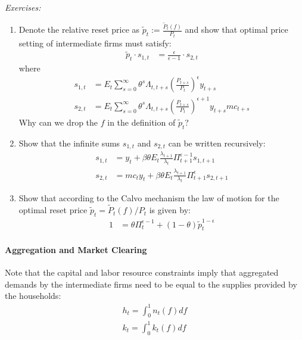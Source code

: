 \newpage
~\\\noindent\emph{Exercises:}
\begin{enumerate}[resume]

\item Denote the relative reset price as $\widetilde{p}_t := \frac{\widetilde{P}_t(f)}{P_t}$ and 
  show that optimal price setting of intermediate firms must satisfy:
\begin{align}
\widetilde{p}_t \cdot s_{1,t} &= \frac{\epsilon}{\epsilon-1} \cdot s_{2,t} \label{eq:NewKeynesian.IntermediateFirms.PriceSetting}
\end{align}
where
\begin{align*}
s_{1,t} &= E_t\sum_{s=0}^{\infty}\theta^s \Lambda_{t,t+s} \left(\frac{P_{t+s}}{P_t}\right)^{\epsilon} y_{t+s}
\\
s_{2,t} &= E_t \sum_{s=0}^{\infty}\theta^s \Lambda_{t,t+s} \left(\frac{P_{t+s}}{P_t}\right)^{\epsilon+1} y_{t+s} mc_{t+s}
\end{align*}
Why can we drop the $f$ in the definition of $\widetilde{p}_t$?

\item Show that the infinite sums $s_{1,t}$ and $s_{2,t}$ can be written recursively:
\begin{align}
s_{1,t} &= y_t             + \beta \theta E_t \frac{\lambda_{t+1}}{\lambda_t} \Pi_{t+1}^{\epsilon-1}s_{1,t+1}
\label{eq:NewKeynesian.IntermediateFirms.PriceSettingSum1}
\\
s_{2,t} &=  mc_t y_{t}  + \beta \theta E_t \frac{\lambda_{t+1}}{\lambda_t} \Pi_{t+1}^{\epsilon} s_{2,t+1}
\label{eq:NewKeynesian.IntermediateFirms.PriceSettingSum2}
\end{align}

\item Show that according to the Calvo mechanism the law of motion for the optimal reset price $\widetilde{p}_t = \widetilde{P}_t(f) / P_t$ is given by:
\begin{align}
1&=\theta \Pi_{t}^{\epsilon-1}+\left(1-\theta\right) \widetilde{p}_t^{1-\epsilon}
\label{eq:NewKeynesian.ResetPriceLoM}
\end{align}
\end{enumerate}

\paragraph{Aggregation and Market Clearing}
Note that the capital and labor resource constraints imply that aggregated demands by the intermediate firms need to be equal to the supplies provided by the households:
\begin{align}
h_t = \int_0^1 n_t(f) df \label{eq:NewKeynesian.LaborMarketClearing}
\\
k_{t} = \int_0^1 k_t(f) df \label{eq:NewKeynesian.CapitalMarketClearing}
\end{align}

